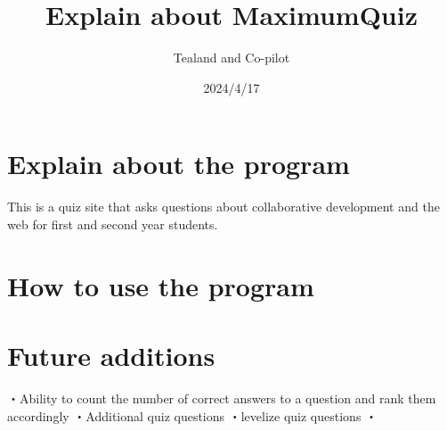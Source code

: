 \documentclass{article}ドキュメントのクラスを指定するコマンド
\title{Explain about MaximumQuiz}  ここでは日本語は表示されなくなる
\author{Tealand and Co-pilot}
\date{2024/4/17}
\begin{document}
\maketitle

\section{Explain about the program}

This is a quiz site that asks questions about collaborative development and the web for first and second year students.

\section{How to use the program}


\section{Future additions}
・Ability to count the number of correct answers to a question and rank them accordingly
・Additional quiz questions
・levelize quiz questions
・
\end{document}
